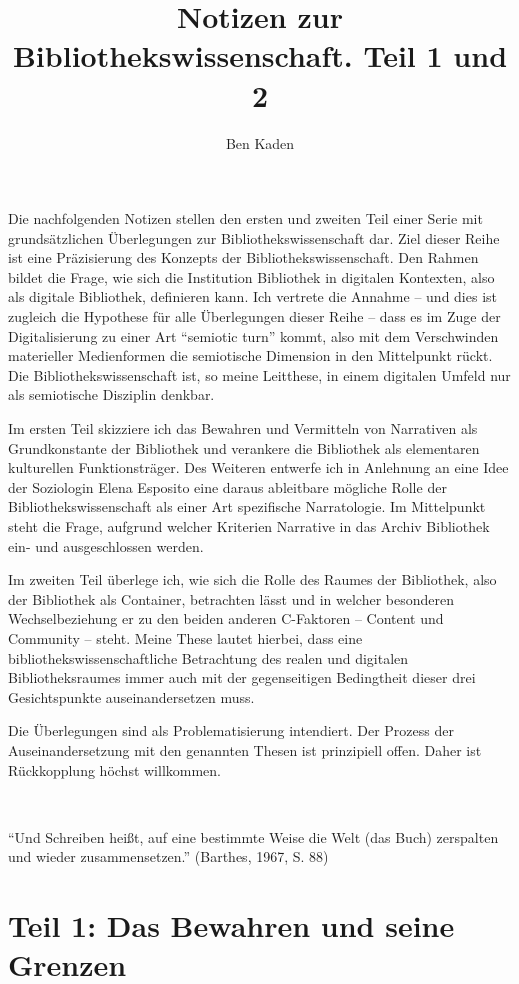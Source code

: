 \documentclass[output=paper]{langscibook}
\title{Notizen zur Bibliothekswissenschaft. Teil 1 und 2}
\author{Ben Kaden}
\begin{document}
\maketitle


\noindent Die nachfolgenden Notizen stellen den ersten und zweiten Teil einer
Serie mit grundsätzlichen Überlegungen zur Bibliothekswissenschaft dar.
Ziel dieser Reihe ist eine Präzisierung des Konzepts der
Bibliothekswissenschaft. Den Rahmen bildet die Frage, wie sich die
Institution Bibliothek in digitalen Kontexten, also als digitale
Bibliothek, definieren kann. Ich vertrete die Annahme -- und dies ist
zugleich die Hypothese für alle Überlegungen dieser Reihe -- dass es im
Zuge der Digitalisierung zu einer Art \enquote{semiotic turn} kommt,
also mit dem Verschwinden materieller Medienformen die semiotische
Dimension in den Mittelpunkt rückt. Die Bibliothekswissenschaft ist, so
meine Leitthese, in einem digitalen Umfeld nur als semiotische Disziplin
denkbar.

Im ersten Teil skizziere ich das Bewahren und Vermitteln von Narrativen
als Grundkonstante der Bibliothek und verankere die Bibliothek als
elementaren kulturellen Funktionsträger. Des Weiteren entwerfe ich in
Anlehnung an eine Idee der Soziologin Elena Esposito eine daraus
ableitbare mögliche Rolle der Bibliothekswissenschaft als einer Art
spezifische Narratologie. Im Mittelpunkt steht die Frage, aufgrund
welcher Kriterien Narrative in das Archiv Bibliothek ein- und
ausgeschlossen werden.

Im zweiten Teil überlege ich, wie sich die Rolle des Raumes der
Bibliothek, also der Bibliothek als Container, betrachten lässt und in
welcher besonderen Wechselbeziehung er zu den beiden anderen C-Faktoren
-- Content und Community -- steht. Meine These lautet hierbei, dass eine
bibliothekswissenschaftliche Betrachtung des realen und digitalen
Bibliotheksraumes immer auch mit der gegenseitigen Bedingtheit dieser
drei Gesichtspunkte auseinandersetzen muss.

Die Überlegungen sind als Problematisierung intendiert. Der Prozess der
Auseinandersetzung mit den genannten Thesen ist prinzipiell offen. Daher
ist Rückkopplung höchst willkommen.

~

\enquote{Und Schreiben heißt, auf eine bestimmte Weise die Welt (das
Buch) zerspalten und wieder zusammensetzen.} (Barthes, 1967, S. 88)

\hypertarget{teil-1-das-bewahren-und-seine-grenzen}{%
\section*{Teil 1: Das Bewahren und seine
Grenzen}\label{teil-1-das-bewahren-und-seine-grenzen}}
\end{document}
